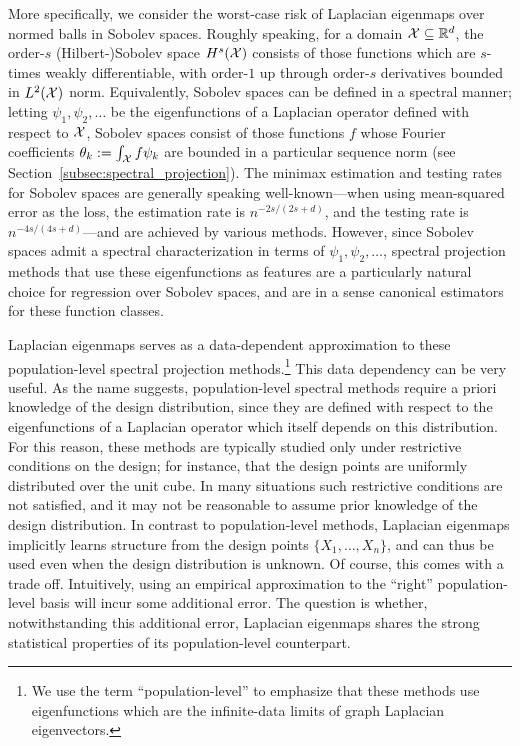 More specifically, we consider the worst-case risk of Laplacian eigenmaps over normed balls in Sobolev spaces. Roughly speaking, for a domain $\mathcal{X} \subseteq \mathbb{R}^d$, the order-$s$ (Hilbert-)Sobolev space $H^s(\mathcal{X})$ consists of those functions which are $s$-times weakly differentiable, with order-$1$ up through order-$s$ derivatives bounded in $L^2(\mathcal{X})$ norm. Equivalently, Sobolev spaces can be defined in a spectral manner;  letting $\psi_1,\psi_2,\ldots$ be the eigenfunctions of a Laplacian operator defined with respect to $\mathcal{X}$, Sobolev spaces consist of those functions $f$ whose Fourier coefficients $\theta_k := \int_{\mathcal{X}} f \psi_k$ are bounded in a particular sequence norm (see Section~\ref{subsec:spectral_projection}). The minimax estimation and testing rates for Sobolev spaces are generally speaking well-known---when using mean-squared error as the loss, the estimation rate is $n^{-2s/(2s + d)}$, and the testing rate is $n^{-4s/(4s + d)}$---and are achieved by various methods. However, since Sobolev spaces admit a spectral characterization in terms of $\psi_1,\psi_2,\ldots$, spectral projection methods that use these eigenfunctions as features are a particularly natural choice for regression over Sobolev spaces, and are in a sense canonical estimators for these function classes. 

Laplacian eigenmaps serves as a data-dependent approximation to these population-level spectral projection methods.\footnote{We use the term ``population-level'' to emphasize that these methods use eigenfunctions which are the infinite-data limits of graph Laplacian eigenvectors.} This data dependency can be very useful. As the name suggests, population-level spectral methods require a priori knowledge of the design distribution, since they are defined with respect to the eigenfunctions of a Laplacian operator which itself depends on this distribution. For this reason, these methods are typically studied only under restrictive conditions on the design; for instance, that the design points are uniformly distributed over the unit cube. In many situations such restrictive conditions are not satisfied, and it may not be reasonable to assume prior knowledge of the design distribution. In contrast to population-level methods, Laplacian eigenmaps implicitly learns structure from the design points $\{X_1,\ldots,X_n\}$, and can thus be used even when the design distribution is unknown. Of course, this comes with a trade off. Intuitively, using an empirical approximation to the ``right'' population-level basis will incur some additional error. The question is whether, notwithstanding this additional error, Laplacian eigenmaps shares the strong statistical properties of its population-level counterpart.

